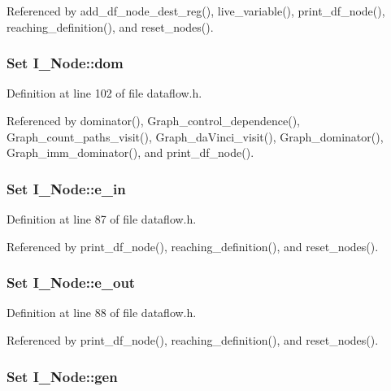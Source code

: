 Referenced by add\_\-df\_\-node\_\-dest\_\-reg(), live\_\-variable(), print\_\-df\_\-node(), reaching\_\-definition(), and reset\_\-nodes().
\subsubsection{\setlength{\rightskip}{0pt plus 5cm}\bf{Set} \bf{I\_\-Node::dom}}\label{structI__Node_f1cdfd68250e0db34d4d1a2bec991a76}




Definition at line 102 of file dataflow.h.

Referenced by dominator(), Graph\_\-control\_\-dependence(), Graph\_\-count\_\-paths\_\-visit(), Graph\_\-da\-Vinci\_\-visit(), Graph\_\-dominator(), Graph\_\-imm\_\-dominator(), and print\_\-df\_\-node().
\subsubsection{\setlength{\rightskip}{0pt plus 5cm}\bf{Set} \bf{I\_\-Node::e\_\-in}}\label{structI__Node_d14652a5df787a7e333cffed37bde19f}




Definition at line 87 of file dataflow.h.

Referenced by print\_\-df\_\-node(), reaching\_\-definition(), and reset\_\-nodes().
\subsubsection{\setlength{\rightskip}{0pt plus 5cm}\bf{Set} \bf{I\_\-Node::e\_\-out}}\label{structI__Node_685a627acf22e302da5e78c1912425a9}




Definition at line 88 of file dataflow.h.

Referenced by print\_\-df\_\-node(), reaching\_\-definition(), and reset\_\-nodes().
\subsubsection{\setlength{\rightskip}{0pt plus 5cm}\bf{Set} \bf{I\_\-Node::gen}}\label{structI__Node_a009f5537f9e4866f296467b535b0e1b}




